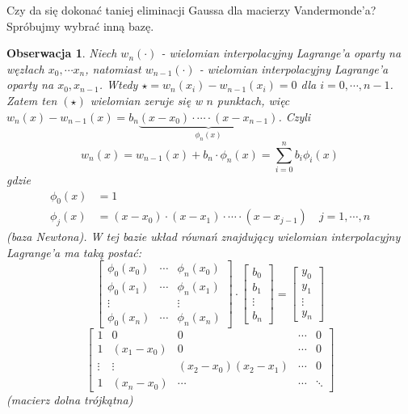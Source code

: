 \documentclass[hidelinks,a4paper,fleqn,oneside]{book}
\newtheorem{obserw}{Obserwacja}
\begin{document}
Czy da się dokonać taniej eliminacji Gaussa dla macierzy Vandermonde'a? Spróbujmy wybrać inną bazę.

\begin{obserw}
Niech $w_n(\cdot)$ - wielomian interpolacyjny Lagrange'a oparty na węzłach $x_0, \cdots x_n$, natomiast $w_{n-1}(\cdot)$ - wielomian interpolacyjny Lagrange'a oparty na $x_0, x_{n-1}$. Wtedy $\star = w_n(x_i) - w_{n-1}(x_i) = 0$ dla $i=0, \cdots, n-1$. Zatem ten $(\star)$ wielomian zeruje się w $n$ punktach, więc $w_n(x) - w_{n-1}(x) = b_n\underbrace{(x-x_0)\cdot \cdots \cdot (x-x_{n-1})}_{\phi_n(x)}$. Czyli
\[
	w_n(x) = w_{n-1}(x) + b_n\cdot\phi_n(x) = \sum_{i=0}^{n} b_i\phi_i(x)
\]
gdzie 
\begin{align*}
    \phi_0(x) & = 1\\
    \phi_j(x) & = (x-x_0) \cdot (x-x_1) \cdot \cdots \cdot (x - x_{j-1}) \quad j=1, \cdots, n
\end{align*}
(baza Newtona). W tej bazie układ równań znajdujący wielomian interpolacyjny Lagrange'a ma taką postać:
\[
\left[
	\begin{array}{ccc}
		\phi_0(x_0) & \cdots & \phi_n(x_0) \\
		\phi_0(x_1) & \cdots & \phi_n(x_1) \\
		\vdots & & \vdots \\
		\phi_0(x_n) & \cdots & \phi_n(x_n)
	\end{array}
\right]
\cdot
\left[
	\begin{array}{c}
		b_0 \\
		b_1 \\
		\vdots \\
		b_n
	\end{array}
\right]
=
\left[
	\begin{array}{c}
		y_0 \\
		y_1 \\
		\vdots \\
		y_n
	\end{array}
\right]
\]
\[
\left[
\begin{array}{ccccc}
1 & 0 & 0 & \cdots & 0 \\
1 & (x_1 - x_0) & 0 & \cdots & 0 \\
\vdots & \vdots & (x_2 - x_0)(x_2 - x_1) & \cdots & 0 \\
1 & (x_n - x_0) & \cdots & \cdots & \ddots
\end{array}
\right]
\]
(macierz dolna trójkątna)
\end{obserw}
\end{document}
